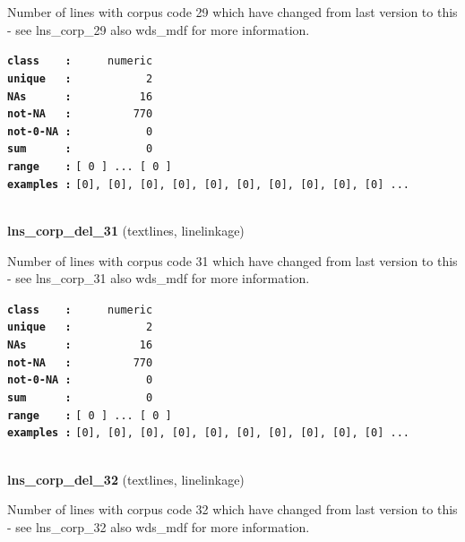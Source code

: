 \documentclass[]{article}
\begin{document}
Number of lines with corpus code 29 which have changed from last version
to this - see lns\_corp\_29 also wds\_mdf for more information.

\textbf{\texttt{class\ \ \ \ :}} \texttt{~~~~~numeric}\\
\textbf{\texttt{unique\ \ \ :}} \texttt{~~~~~~~~~~~2}\\
\textbf{\texttt{NAs\ \ \ \ \ \ :}} \texttt{~~~~~~~~~~16}\\
\textbf{\texttt{not-NA\ \ \ :}} \texttt{~~~~~~~~~770}\\
\textbf{\texttt{not-0-NA\ :}} \texttt{~~~~~~~~~~~0}\\
\textbf{\texttt{sum\ \ \ \ \ \ :}} \texttt{~~~~~~~~~~~0}\\
\textbf{\texttt{range\ \ \ \ :}}
\texttt{{[}\ 0\ {]}\ ...\ {[}\ 0\ {]}}\\
\textbf{\texttt{examples\ :}}
\texttt{{[}0{]},\ {[}0{]},\ {[}0{]},\ {[}0{]},\ {[}0{]},\ {[}0{]},\ {[}0{]},\ {[}0{]},\ {[}0{]},\ {[}0{]}\ ...}\\

~

\textbf{lns\_corp\_del\_31} (textlines, linelinkage)

Number of lines with corpus code 31 which have changed from last version
to this - see lns\_corp\_31 also wds\_mdf for more information.

\textbf{\texttt{class\ \ \ \ :}} \texttt{~~~~~numeric}\\
\textbf{\texttt{unique\ \ \ :}} \texttt{~~~~~~~~~~~2}\\
\textbf{\texttt{NAs\ \ \ \ \ \ :}} \texttt{~~~~~~~~~~16}\\
\textbf{\texttt{not-NA\ \ \ :}} \texttt{~~~~~~~~~770}\\
\textbf{\texttt{not-0-NA\ :}} \texttt{~~~~~~~~~~~0}\\
\textbf{\texttt{sum\ \ \ \ \ \ :}} \texttt{~~~~~~~~~~~0}\\
\textbf{\texttt{range\ \ \ \ :}}
\texttt{{[}\ 0\ {]}\ ...\ {[}\ 0\ {]}}\\
\textbf{\texttt{examples\ :}}
\texttt{{[}0{]},\ {[}0{]},\ {[}0{]},\ {[}0{]},\ {[}0{]},\ {[}0{]},\ {[}0{]},\ {[}0{]},\ {[}0{]},\ {[}0{]}\ ...}\\

~

\textbf{lns\_corp\_del\_32} (textlines, linelinkage)

Number of lines with corpus code 32 which have changed from last version
to this - see lns\_corp\_32 also wds\_mdf for more information.
\end{document}
